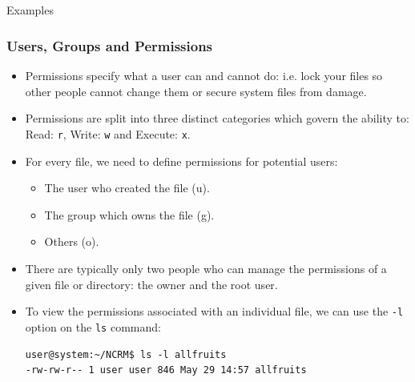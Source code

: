 \documentclass[10pt]{beamer}
\begin{document}
\subsection{}
\begin{frame}[fragile]{Examples}
\frametitle{Users, Groups and Permissions}
\begin{itemize}
\item Permissions  specify what a user can and cannot do: i.e. lock your files so other people cannot change them or secure system files from damage. \vspace{0.05in}
\item Permissions are split into three distinct categories which govern the ability to: Read: \texttt{r}, Write: \texttt{w} and Execute: \texttt{x}.\vspace{0.05in}
\item For every file, we need to define permissions for potential users: 
\begin{itemize}
\item The user who created the file (u).
\item The group which owns the file (g).
\item Others (o).\vspace{0.05in}
\end{itemize}
\item There are typically only two people who can manage the permissions of a given file or directory: the owner and the root user. \vspace{0.05in}
\item To view the permissions associated with an individual file, we can use the \texttt{-l} option on the \texttt{ls} command:\\ \vspace{0.05in}
\begin{lstlisting}[style=BashInputStyle]
user@system:~/NCRM$ ls -l allfruits
-rw-rw-r-- 1 user user 846 May 29 14:57 allfruits
\end{lstlisting}
\end{itemize}
\end{frame}
\end{document}
